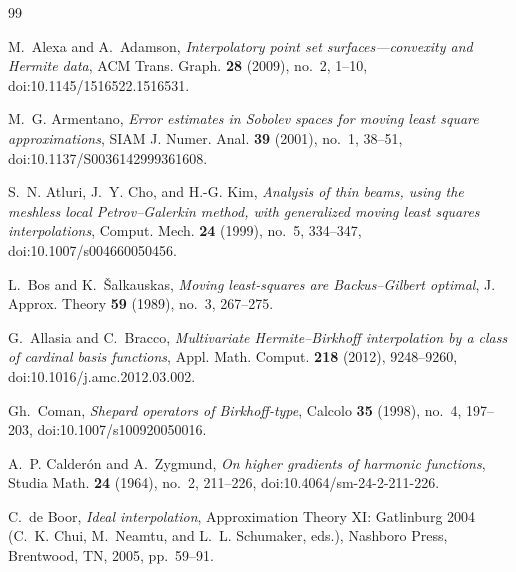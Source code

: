 \documentclass[12pt]{amsart}
\theoremstyle{definition}
\theoremstyle{remark}
\begin{document}

\begin{thebibliography}{99}

M.~Alexa and A.~Adamson, \emph{Interpolatory point set surfaces---convexity and {H}ermite data},
ACM Trans. Graph. \textbf{28} (2009), no.~2, 1--10, doi:10.1145/1516522.1516531.

M.~G. Armentano, \emph{Error estimates in {S}obolev spaces for moving least square
approximations}, SIAM J. Numer. Anal. \textbf{39} (2001), no.~1, 38--51,
doi:10.1137/S0036142999361608.

S.~N. Atluri, J.~Y. Cho, and H.-G. Kim, \emph{Analysis of thin beams, using the meshless local {P}etrov--{G}alerkin method, with generalized moving least squares interpolations}, Comput. Mech. \textbf{24} (1999), no.~5, 334--347, doi:10.1007/s004660050456.

L.~Bos and K.~\v{S}alkauskas, \emph{Moving least-squares are {B}ackus--{G}ilbert optimal}, J. Approx. Theory \textbf{59} (1989), no.~3, 267--275.

G.~Allasia and C.~Bracco, \emph{Multivariate {H}ermite--{B}irkhoff interpolation by a class of
cardinal basis functions}, Appl. Math. Comput. \textbf{218} (2012), 9248--9260,
doi:10.1016/j.amc.2012.03.002.

Gh.~Coman, \emph{Shepard operators of {B}irkhoff-type}, Calcolo \textbf{35} (1998), no.~4,
197--203, doi:10.1007/s100920050016.

A.~P. Calder\'on and A.~Zygmund, \emph{On higher gradients of harmonic functions}, Studia Math.
\textbf{24} (1964), no.~2, 211--226, doi:10.4064/sm-24-2-211-226.

C.~de Boor, \emph{Ideal interpolation}, Approximation Theory XI: Gatlinburg 2004 (C.~K. Chui, M.~Neamtu, and L.~L. Schumaker, eds.), Nashboro Press, Brentwood, TN, 2005, pp.~59--91.


\end{thebibliography}
\end{document}
